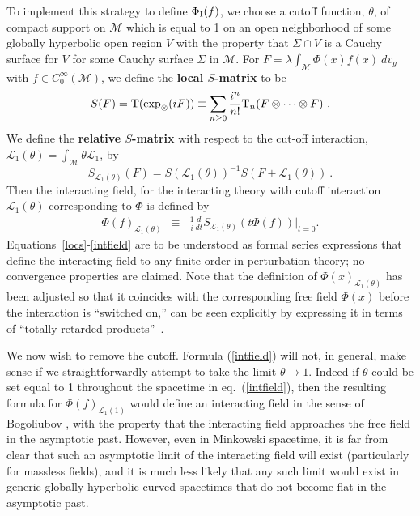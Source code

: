 \documentclass[12pt]{article}
\newcommand{\rI}{{\rm I}}
\newcommand{\eL}{\mathscr{L}}
\newcommand{\M}{\mathscr{M}}
\renewcommand{\O}{\Phi}
\newcommand{\T}{{\rm T}}
\theoremstyle{plain}
\theoremstyle{definition}
\def\ben{\begin{equation}}
\def\een{\end{equation}}
\begin{document}
To implement this strategy to define $\O_\rI(f)$, we choose a cutoff function, $\theta$, of compact
support on $\M$ which is equal to 1 on an open neighborhood of some globally hyperbolic open region $V$ with
the property that $\Sigma \cap V$ is a Cauchy surface for $V$ for some
Cauchy surface $\Sigma$ in $\M$. For $F = \lambda \int_\M \O(x) f(x) \ dv_g$ with $f \in C^\infty_0(\M)$,
we define the {\bf local $S$-matrix} to be
\ben
S(F) = \T(\exp_\otimes (iF)) \equiv \sum_{n \ge 0} \frac{i^n}{n!} \T_n(F \otimes \cdots \otimes F) \ .
\label{locs}
\een
We define the {\bf relative $S$-matrix}
with respect to the cut-off interaction, $\eL_1(\theta) = \int_\M \theta \eL_1$, by
\begin{equation}
\label{rels}
S_{\eL_1(\theta)}(F) = S(\eL_1(\theta))^{-1} S(F+\eL_1(\theta)) \ .
\end{equation}
Then the interacting field, for the interacting theory
with cutoff interaction $\eL_1(\theta)$ corresponding to $\O$ is defined by \cite{bs}
\begin{eqnarray}
\O(f)_{\eL_1(\theta)} &\equiv&
\frac{1}{i} \frac{d}{dt} S_{\eL_1(\theta)}( t\O(f) )
\bigg|_{t=0}.
\label{intfield}
\end{eqnarray}
Equations~\eqref{locs}-\eqref{intfield} are to be understood as formal series
expressions that define the interacting field to any finite order in perturbation theory;
no convergence properties are claimed. Note that
the definition of $\O(x)_{\eL_1(\theta)}$ has been adjusted
so that it coincides with the corresponding free
field $\O(x)$ before the interaction is ``switched on,''
can be seen explicitly by expressing it
in terms of ``totally retarded products''~\cite{hw3,bf2,duetsch2}.

We now wish to remove the cutoff. Formula (\ref{intfield})  will not, in general, make sense if we
straightforwardly attempt to take the limit $\theta \to 1$. Indeed if
$\theta$ could be set equal to 1 throughout the spacetime in
eq.~(\ref{intfield}), then the resulting formula for $\O(f)_{\eL_1(1)}$
would define an interacting field in the sense of Bogoliubov
\cite{bs}, with the property that the interacting field approaches the
free field in the asymptotic past. However, even in Minkowski
spacetime, it is far from clear that such an asymptotic limit of the
interacting field will exist (particularly for massless fields), and it
is much less likely that any such limit would exist in generic
globally hyperbolic curved spacetimes that do not become flat in the
asymptotic past.
\end{document}
